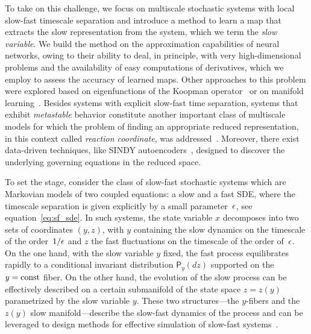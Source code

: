 \documentclass{article}
\newcommand{\invm}{\mathsf{P}} %
\begin{document}
To take on this challenge, we focus on multiscale stochastic systems with local slow-fast timescale separation and introduce a method to learn a map that extracts the slow representation from the system, which we term the \emph{slow variable}. We build the method on the approximation capabilities of neural networks, owing to their ability to deal, in principle, with very high-dimensional problems and the availability of easy computations of derivatives, which we employ to assess the accuracy of learned maps. Other approaches to this problem were explored based on eigenfunctions of the Koopman operator~\cite{froyland_computational_2014, froyland_trajectory-free_2016} or on manifold learning~\cite{singer_detecting_2009, dsilva_data-driven_2016}. Besides systems with explicit slow-fast time separation, systems that exhibit \emph{metastable} behavior constitute another important class of multiscale models for which the problem of finding an appropriate reduced representation, in this context called \emph{reaction coordinate}, was addressed~\cite{mcgibbon_identification_2017,bittracher_transition_2018,bittracher_weak_2020}. Moreover, there exist data-driven techniques, like SINDY autoencoders~\cite{champion_data-driven_2019, champion_discovery_2019}, designed to discover the underlying governing equations in the reduced space.

To set the stage, consider the class of slow-fast stochastic systems which are Markovian models of two coupled equations: a slow and a fast SDE, where the timescale separation is given explicitly by a small parameter~$\epsilon$, see equation~\eqref{eq:sf_sde}. In such systems, the state variable $x$ decomposes into two sets of coordinates $(y,z)$, with $y$ containing the slow dynamics on the timescale of the order~$1/\epsilon$ and $z$ the fast fluctuations on the timescale of the order of~$\epsilon$. On the one hand, with the slow variable $y$ fixed, the fast process equilibrates rapidly to a conditional invariant distribution $\invm_{\!y}(dz)$ supported on the $y=\mathrm{const}$ fiber. On the other hand, the evolution of the slow process can be effectively described on a certain submanifold of the state space $z=z(y)$ parametrized by the slow variable $y$. These two structures---the $y$-fibers and the $z(y)$ slow manifold---describe the slow-fast dynamics of the process and can be leveraged to design methods for effective simulation of slow-fast systems~\cite{givon_extracting_2004, e_analysis_2005}.
\end{document}
